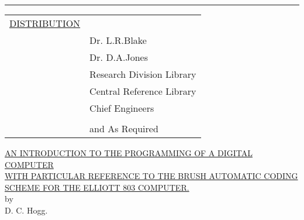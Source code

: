 \documentclass[10pt, a4paper, oneside]{article}
\newcommand{\myuline}[1]{\uline{#1}}
\begin{document}
\newpage

\tableofcontents
\listoffigures

\vfill

\par\noindent\rule{\textwidth}{0.4pt}\relax

\vspace{5mm}
\noindent
\begin{tabular}{ll}
\myuline{DISTRIBUTION} & \\
& Dr. L.R.Blake \\
& Dr. D.A.Jones \\
& Research Division Library \\
& Central Reference Library \\
& Chief Engineers \\
& \\
& and As Required \\
\end{tabular}


\newpage

\setcounter{page}{1}
\cfoot{\thepage}

\begin{center}
\myuline{AN INTRODUCTION TO THE PROGRAMMING OF A DIGITAL COMPUTER} \\
\myuline{WITH PARTICULAR REFERENCE TO THE BRUSH AUTOMATIC CODING} \\
\myuline{SCHEME FOR THE ELLIOTT 803 COMPUTER.} \\
by \\
D. C. Hogg. \\
\end{center}

\small
\end{document}
